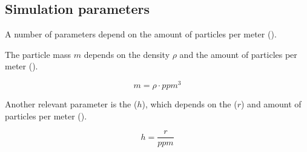 \subsection{Simulation parameters}

A number of parameters depend on the amount of particles per meter
().

The particle mass $m$ depends on the density $\rho$ and the amount of particles
per meter ().

\[
m = \rho \cdot ppm^3
\]

Another relevant parameter is the  ($h$), which
depends on the  ($r$) and amount of particles per
meter ().

\[
h = \frac{r}{ppm}
\]
